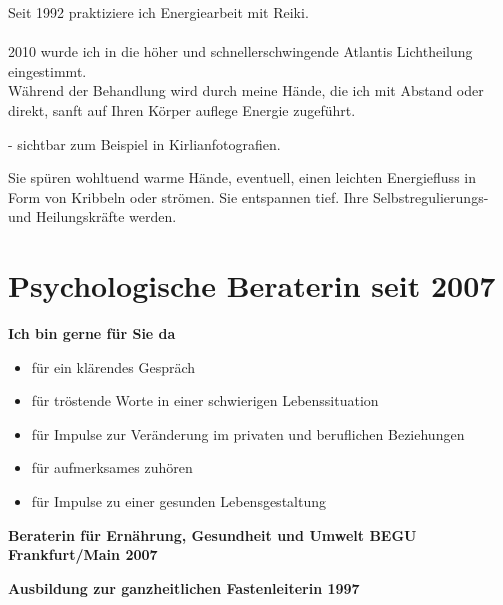 \documentclass[10pt,foldmark,notumble]{leaflet}
\begin{document}
Seit 1992 praktiziere ich Energiearbeit mit Reiki.\\ 
\\ 
2010 wurde ich in die höher und schnellerschwingende Atlantis Lichtheilung eingestimmt.\\ 
Während der Behandlung wird durch meine Hände, die ich mit Abstand oder direkt, sanft auf Ihren Körper auflege Energie zugeführt.

\begin{center}
- sichtbar zum Beispiel in Kirlianfotografien.
\end{center}

Sie spüren wohltuend warme Hände, eventuell, einen leichten Energiefluss in Form von Kribbeln oder strömen. Sie entspannen tief. Ihre Selbstregulierungs- und Heilungskräfte werden.






\newpage


\section{Psychologische Beraterin seit 2007}

\vspace{2mm}

{\bf Ich bin gerne für Sie da}\\
\begin{itemize}
\item  für ein klärendes Gespräch
\item  für tröstende Worte in einer schwierigen Lebenssituation
\item  für Impulse zur Veränderung im privaten und beruflichen Beziehungen
\item  für aufmerksames zuhören
\item  für Impulse zu einer gesunden Lebensgestaltung
\end{itemize}

\vspace{2mm}

{\bf Beraterin für Ernährung, Gesundheit und Umwelt BEGU Frankfurt/Main 2007}\\

\vspace{2mm}

{\bf Ausbildung zur ganzheitlichen Fastenleiterin 1997}\\
\end{document}

